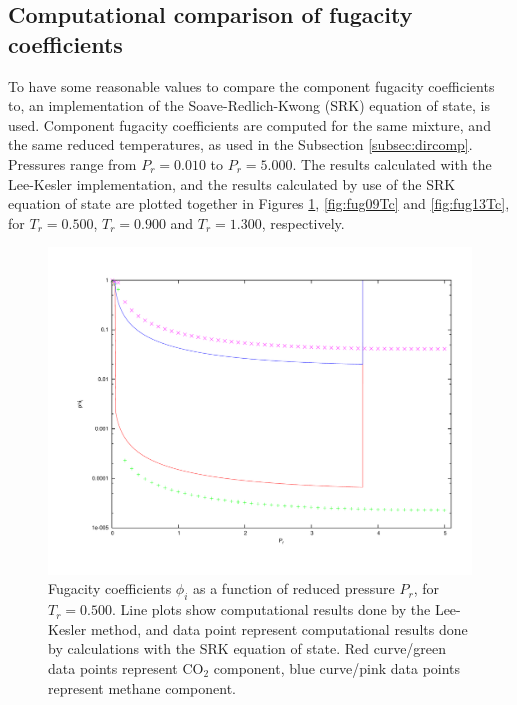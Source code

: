 \documentclass[internal,english]{sintefmemo2012}
\numberwithin{equation}{section}
\begin{document}
\subsection{Computational comparison of fugacity coefficients}
To have some reasonable values to compare the component fugacity coefficients to, an implementation of the Soave-Redlich-Kwong (SRK) equation of state, is used. Component fugacity coefficients are computed for the same mixture, and the same reduced temperatures, as used in the Subsection \ref{subsec:dircomp}. Pressures range from $P_r = 0.010$ to $P_r = 5.000$. The results calculated with the Lee-Kesler implementation, and the results calculated by use of the SRK equation of state are plotted together in Figures \ref{fig:fug05Tc}, \ref{fig:fug09Tc} and \ref{fig:fug13Tc}, for $T_r = 0.500$, $T_r = 0.900$ and $T_r = 1.300$, respectively.

\begin{figure}
	\centering
	\includegraphics[trim = 1.5cm 2cm 0 1cm, clip = true, width=13cm]{fug05Tc}
	\caption{Fugacity coefficients $\phi_i$ as a function of reduced pressure $P_r$, for $T_r = 0.500$. Line plots show computational results done by the Lee-Kesler method, and data point represent computational results done by calculations with the SRK equation of state. Red curve/green data points represent CO$_2$ component, blue curve/pink data points represent methane component.}
	\label{fig:fug05Tc}
\end{figure}
\end{document}
